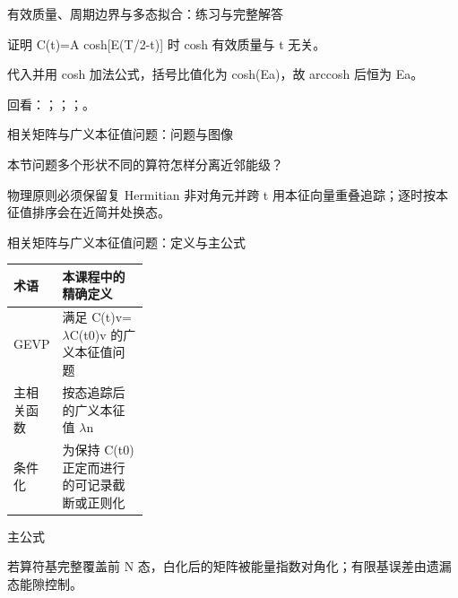 \begin{frame}[t]{有效质量、周期边界与多态拟合：练习与完整解答}
\footnotesize
\begin{block}{}证明 C(t)=A cosh[E(T/\allowbreak{}2-t)] 时 cosh 有效质量与 t 无关。\end{block}
\begin{exampleblock}{}代入并用 cosh 加法公式，括号比值化为 cosh(Ea)，故 arccosh 后恒为 Ea。\end{exampleblock}
\vfill
\scriptsize 回看：；；；。
\end{frame}

\begin{frame}[t]{相关矩阵与广义本征值问题：问题与图像}
\footnotesize
\begin{block}{本节问题}多个形状不同的算符怎样分离近邻能级？\end{block}
\begin{block}{物理原则}\quad 必须保留复 Hermitian 非对角元并跨 t 用本征向量重叠追踪；逐时按本征值排序会在近简并处换态。\end{block}
\end{frame}

\begin{frame}[t]{相关矩阵与广义本征值问题：定义与主公式}
\footnotesize\begin{tabularx}{\linewidth}{p{0.30\linewidth}Y}
\toprule 术语 & 本课程中的精确定义\\\midrule
{} GEVP & 满足 C(t)v=\ensuremath{\lambda}C(t0)v 的广义本征值问题\\
 主相关函数 & 按态追踪后的广义本征值 \ensuremath{\lambda}n\\
 条件化 & 为保持 C(t0) 正定而进行的可记录截断或正则化\\
\bottomrule\end{tabularx}\vspace{0.15cm}
\begin{block}{ 主公式}\centering{}\end{block}
若算符基完整覆盖前 N 态，白化后的矩阵被能量指数对角化；有限基误差由遗漏态能隙控制。
\end{frame}

